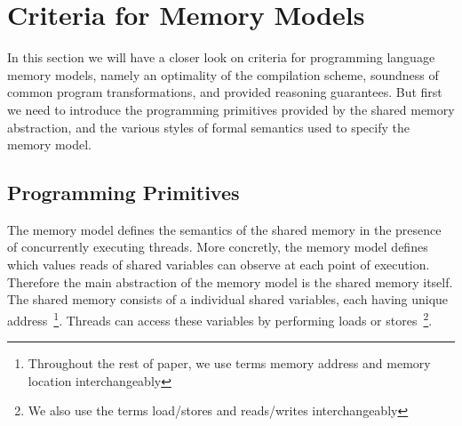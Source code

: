 \section{Criteria for Memory Models}
\label{sec:background}

In this section we will have a closer look on criteria for 
programming language memory models, 
namely an optimality of the compilation scheme, 
soundness of common program transformations, 
and provided reasoning guarantees.  
But first we need to introduce the 
programming primitives provided by the shared memory abstraction, 
and the various styles of formal semantics 
used to specify the memory model. 

\subsection{Programming Primitives}
\label{sec:background:primitives}


The memory model defines the semantics of the shared memory 
in the presence of concurrently executing threads. 
More concretly, the memory model 
defines which values reads of shared variables 
can observe at each point of execution. 
Therefore the main abstraction of the memory model 
is the shared memory itself. 
The shared memory consists of a individual shared variables, 
each having unique address~\footnote{
Throughout the rest of paper, we use terms 
memory address and memory location interchangeably}.
Threads can access these variables by performing 
loads or stores~\footnote{We also use the terms 
load/stores and reads/writes interchangeably}.

